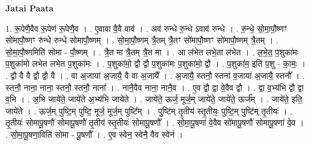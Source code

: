 \documentclass[17pt]{extarticle}
\begin{document}
\textbf{Jatai Paata} \newline

1. रू॒पेणै॒वैव रू॒पेण॑ रू॒पेणै॒व । . ए॒वावा वै॒वै वाव॑ । . अव॑ रुन्धे रु॒न्धे ऽवाव॑ रुन्धे । . रु॒न्धे॒ सो॒मा॒पौ॒ष्णꣳ सो॑मापौ॒ष्णꣳ रु॑न्धे रुन्धे सोमापौ॒ष्णम् । . सो॒मा॒पौ॒ष्णम् त्रै॒तम् त्रै॒तꣳ सो॑मापौ॒ष्णꣳ सो॑मापौ॒ष्णम् त्रै॒तम् । . सो॒मा॒पौ॒ष्णमिति॑ सोमा - पौ॒ष्णम् । . त्रै॒त मा त्रै॒तम् त्रै॒त मा । . आ ल॑भेत लभे॒ता ल॑भेत । . ल॒भे॒त॒ प॒शुका॑मः प॒शुका॑मो लभेत लभेत प॒शुका॑मः । . प॒शुका॑मो॒ द्वौ द्वौ प॒शुका॑मः प॒शुका॑मो॒ द्वौ । . प॒शुका॑म॒ इति॑ प॒शु - का॒मः॒ । . द्वौ वै वै द्वौ द्वौ वै । . वा अ॒जाया॑ अ॒जायै॒ वै वा अ॒जायै᳚ । . अ॒जायै॒ स्तनौ॒ स्तना॑ व॒जाया॑ अ॒जायै॒ स्तनौ᳚ । . स्तनौ॒ नाना॒ नाना॒ स्तनौ॒ स्तनौ॒ नाना᳚ । . नानै॒वैव नाना॒ नानै॒व । . ए॒व द्वौ द्वा वे॒वैव द्वौ । . द्वा व॒भ्य॑भि द्वौ द्वा व॒भि । . अ॒भि जाये॑ते॒ जाये॑ते अ॒भ्य॑भि जाये॑ते । . जाये॑ते॒ ऊर्ज॒ मूर्ज॒म् जाये॑ते॒ जाये॑ते॒ ऊर्ज᳚म् । . जाये॑ते॒ इति॒ जाये॑ते । . ऊर्ज॒म् पुष्टि॒म् पुष्टि॒ मूर्ज॒ मूर्ज॒म् पुष्टि᳚म् । . पुष्टि॑म् तृ॒तीय॑ स्तृ॒तीयः॒ पुष्टि॒म् पुष्टि॑म् तृ॒तीयः॑ । . तृ॒तीयः॑ सोमापू॒षणौ॑ सोमापू॒षणौ॑ तृ॒तीय॑ स्तृ॒तीयः॑ सोमापू॒षणौ᳚ । . सो॒मा॒पू॒षणा॑ वे॒वैव सो॑मापू॒षणौ॑ सोमापू॒षणा॑ वे॒व । . सो॒मा॒पू॒षणा॒विति॑ सोमा - पू॒षणौ᳚ । . ए॒व स्वेन॒ स्वेनै॒ वैव स्वेन॑ । \newline
\end{document}
